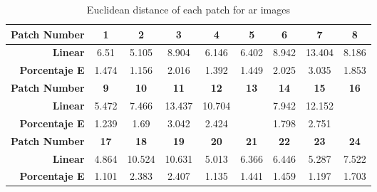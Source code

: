 \begin{table}[H]
  \caption{Euclidean distance of each patch for ar images }
  \begin{center}
    \begin{tabularx}{\textwidth}{r c c c c c c c c}
    \toprule
        \textbf{Patch Number} & \textbf{1} & \textbf{2} & \textbf{3} & \textbf{4} & \textbf{5} & \textbf{6} & \textbf{7} & \textbf{8}\\ \midrule 
        \textbf{Linear} &6.51 &5.105 &8.904 &6.146 &6.402 &8.942 &13.404 &8.186\\ 
        \textbf{Porcentaje E} &1.474 &1.156 &2.016 &1.392 &1.449 &2.025 &3.035 &1.853\\ \midrule 
        \textbf{Patch Number} & \textbf{9} & \textbf{10} & \textbf{11} & \textbf{12} & \textbf{13} & \textbf{14} & \textbf{15} & \textbf{16}\\ \midrule 
        \textbf{Linear} &5.472 &7.466 &13.437 &10.704 &\cellcolor{colorgreen}{4.744} &7.942 &12.152 &\cellcolor{colorred}{15.425}\\ 
        \textbf{Porcentaje E} &1.239 &1.69 &3.042 &2.424 &\cellcolor{colorgreen}{1.074} &1.798 &2.751 &\cellcolor{colorred}{3.492}\\ \midrule 
        \textbf{Patch Number} & \textbf{17} & \textbf{18} & \textbf{19} & \textbf{20} & \textbf{21} & \textbf{22} & \textbf{23} & \textbf{24}\\ \midrule 
        \textbf{Linear} &4.864 &10.524 &10.631 &5.013 &6.366 &6.446 &5.287 &7.522\\ 
        \textbf{Porcentaje E} &1.101 &2.383 &2.407 &1.135 &1.441 &1.459 &1.197 &1.703\\ \midrule 
    \bottomrule
    \end{tabularx}
  \end{center}
\end{table}
